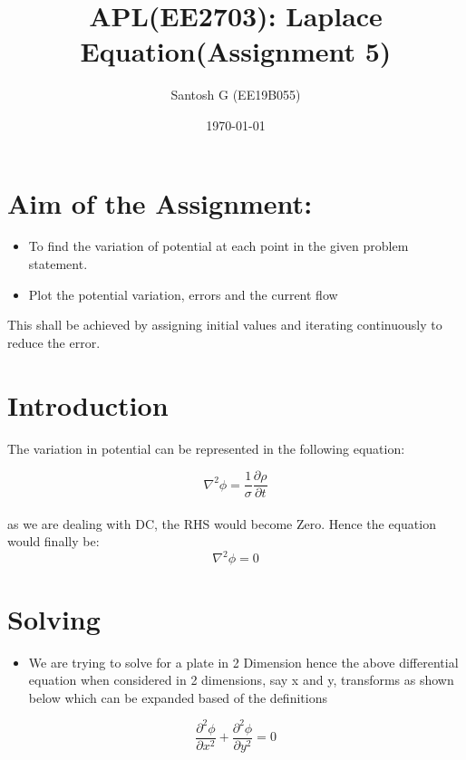 \documentclass[11pt, a4paper]{article}
\title{APL(EE2703): Laplace Equation(Assignment 5)} %
\author{Santosh G  (EE19B055)} %
\date{\today} %
\begin{document}
    \maketitle %

    \section{Aim of the Assignment:}   %
        \begin{itemize}
            \item To find the variation of potential at each point in the given problem statement.
            \item Plot the  potential variation, errors and the current flow
        \end{itemize}
        This shall be achieved by assigning initial values and iterating continuously to reduce the error.
    \section{Introduction}
    The variation in potential can be represented in the following equation:

        \begin{equation}
            \nabla^{2}\phi = \frac{1}{\sigma}\frac{\partial \rho}{\partial t}
        \end{equation}
        \\as we are dealing with DC, the RHS would become Zero. Hence the equation would finally be:
        \\        \begin{equation}
            \nabla^{2}\phi = 0
        \end{equation}        
        \section{Solving}
            \begin{itemize}
    \item
      We are trying to solve for a plate in 2 Dimension hence the above differential equation when considered in 2 dimensions, say x and y, transforms as shown below which can be expanded based of the definitions
          \end{itemize}
    
    \begin{equation}
    \frac{\partial^{2} \phi}{\partial x^{2}}+ \frac{\partial^{2} \phi}{\partial y^{2}} = 0
     \end{equation}
    
\end{document}
